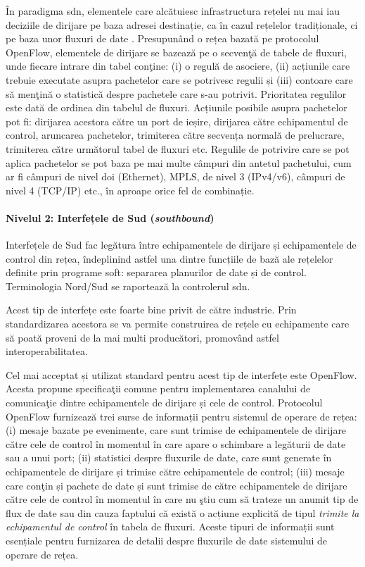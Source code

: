 În paradigma \gls{sdn}, elementele care alcătuiesc infrastructura rețelei nu mai iau deciziile de dirijare pe baza adresei destinație, ca în cazul rețelelor tradiționale, ci pe baza unor fluxuri de date \cite{mckeown2008openflow}. Presupunând o rețea bazată pe protocolul OpenFlow, elementele de dirijare se bazează pe o secvenţă de tabele de fluxuri, unde fiecare intrare din tabel conţine: (i) o regulă de asociere, (ii) acțiunile care trebuie executate asupra pachetelor care se potrivesc regulii și (iii) contoare care să menţină o statistică despre pachetele care s-au potrivit. Prioritatea regulilor este dată de ordinea din tabelul de fluxuri. Acțiunile posibile asupra pachetelor pot fi: dirijarea acestora către un port de ieșire, dirijarea către echipamentul de control, aruncarea pachetelor, trimiterea către secvența normală de prelucrare, trimiterea către următorul tabel de fluxuri etc. Regulile de potrivire care se pot aplica pachetelor se pot baza pe mai multe câmpuri din antetul pachetului, cum ar fi câmpuri de nivel doi (Ethernet), MPLS, de nivel 3 (IPv4/v6), câmpuri de nivel 4 (TCP/IP) etc., în aproape orice fel de combinație.

\paragraph{Nivelul 2: Interfețele de Sud (\textit{southbound})}

Interfețele de Sud fac legătura între echipamentele de dirijare și echipamentele de control din rețea, îndeplinind astfel una dintre funcțiile de bază ale rețelelor definite prin programe soft: separarea planurilor de date și de control. Terminologia Nord/Sud se raportează la controlerul \gls{sdn}.

Acest tip de interfețe este foarte bine privit de către industrie. Prin standardizarea acestora se va permite construirea de rețele cu echipamente care să poată proveni de la mai multi producători, promovând astfel interoperabilitatea.

Cel mai acceptat și utilizat standard pentru acest tip de interfețe este OpenFlow. Acesta propune specificaţii comune pentru implementarea canalului de comunicaţie dintre echipamentele de dirijare și cele de control. Protocolul OpenFlow furnizează trei surse de informații pentru sistemul de operare de rețea: (i) mesaje bazate pe evenimente, care sunt trimise de echipamentele de dirijare către cele de control în momentul în care apare o schimbare a legăturii de date sau a unui port; (ii) statistici despre fluxurile de date, care sunt generate în echipamentele de dirijare și trimise către echipamentele de control; (iii) mesaje care conţin și pachete de date și sunt trimise de către echipamentele de dirijare către cele de control în momentul în care nu ştiu cum să trateze un anumit tip de flux de date sau din cauza faptului că există o acțiune explicită de tipul \textit{trimite la echipamentul de control} în tabela de fluxuri. Aceste tipuri de informații sunt esențiale pentru furnizarea de detalii despre fluxurile de date sistemului de operare de rețea.

